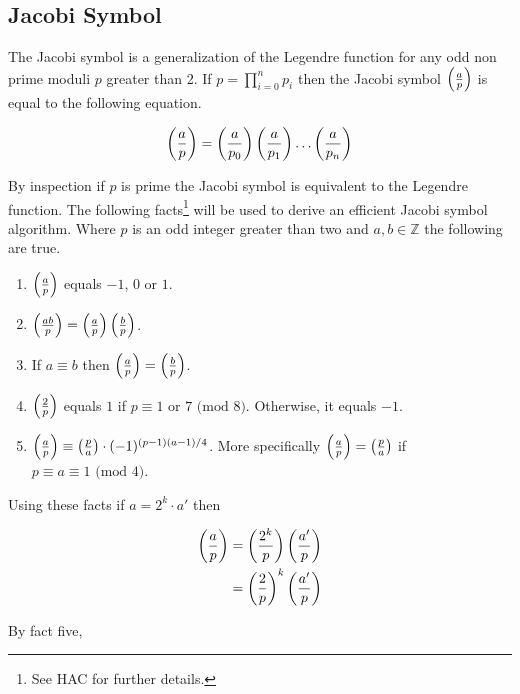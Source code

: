 \documentclass[b5paper]{book}
\def\Z{{\mathbb Z}}
\begin{document}
\subsection{Jacobi Symbol}
The Jacobi symbol is a generalization of the Legendre function for any odd non prime moduli $p$ greater than 2.  If $p = \prod_{i=0}^n p_i$ then
the Jacobi symbol $\left ( { a \over p } \right )$ is equal to the following equation.

\begin{equation}
\left ( { a \over p } \right ) = \left ( { a \over p_0} \right ) \left ( { a \over p_1} \right ) \ldots \left ( { a \over p_n} \right )
\end{equation}

By inspection if $p$ is prime the Jacobi symbol is equivalent to the Legendre function.  The following facts\footnote{See HAC \cite[pp. 72-74]{HAC} for
further details.} will be used to derive an efficient Jacobi symbol algorithm.  Where $p$ is an odd integer greater than two and $a, b \in \Z$ the
following are true.  

\begin{enumerate}
\item $\left ( { a \over p} \right )$ equals $-1$, $0$ or $1$. 
\item $\left ( { ab \over p} \right ) = \left ( { a \over p} \right )\left ( { b \over p} \right )$.
\item If $a \equiv b$ then $\left ( { a \over p} \right ) = \left ( { b \over p} \right )$.
\item $\left ( { 2 \over p} \right )$ equals $1$ if $p \equiv 1$ or $7 \mbox{ (mod }8\mbox{)}$.  Otherwise, it equals $-1$.
\item $\left ( { a \over p} \right ) \equiv \left ( { p \over a} \right ) \cdot (-1)^{(p-1)(a-1)/4}$.  More specifically 
$\left ( { a \over p} \right ) = \left ( { p \over a} \right )$ if $p \equiv a \equiv 1 \mbox{ (mod }4\mbox{)}$.  
\end{enumerate}

Using these facts if $a = 2^k \cdot a'$ then

\begin{eqnarray}
\left ( { a \over p } \right ) = \left ( {{2^k} \over p } \right ) \left ( {a' \over p} \right ) \nonumber \\
                               = \left ( {2 \over p } \right )^k \left ( {a' \over p} \right ) 
\label{eqn:jacobi}
\end{eqnarray}

By fact five, 
\end{document}
